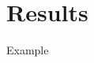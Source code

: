 \documentclass[../Main_PhD_Dissertation.tex]{subfiles}
\begin{document}
	
	\chapter{Results}
	\label{chap:Results}	
	
	Example 
	
	
\end{document}

